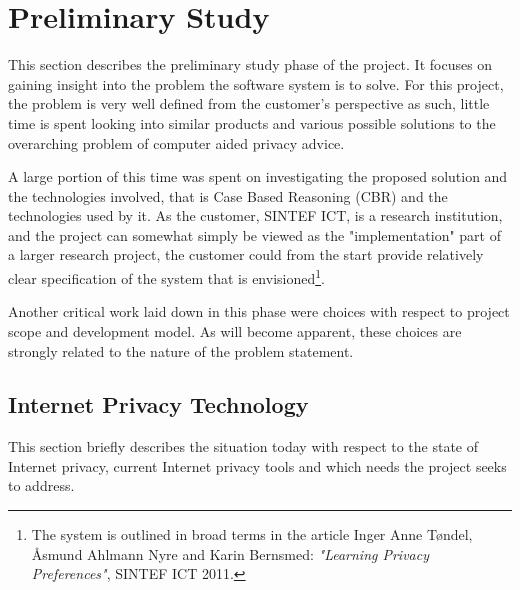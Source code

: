  

\chapter{Preliminary Study\label{prelim}}


\minitoc

This section describes the preliminary study phase of the project. It focuses on gaining insight into the problem the software system is to solve. For this project, the problem is very well defined from the customer's perspective as such, little time is spent looking into similar products and various possible solutions to the overarching problem of computer aided privacy advice.

A large portion of this time was spent on investigating the proposed solution and the technologies involved, that is Case Based Reasoning (CBR) and the technologies used by it. As the customer, SINTEF ICT, is a research institution, and the project can somewhat simply be viewed as the "implementation" part of a larger research project, the customer could from the start provide relatively clear specification of the system that is envisioned\footnote{The system is outlined in broad terms in the article Inger Anne T{\o}ndel, {\AA}smund Ahlmann Nyre and Karin Bernsmed: \emph{"Learning Privacy Preferences"}, SINTEF ICT 2011.}. 

Another critical work laid down in this phase were choices with respect to project scope and development model. As will become apparent, these choices are strongly related to the nature of the problem statement.

\section{Internet Privacy Technology}

This section briefly describes the situation today with respect to the state of Internet privacy, current Internet privacy tools and which needs the project seeks to address.

